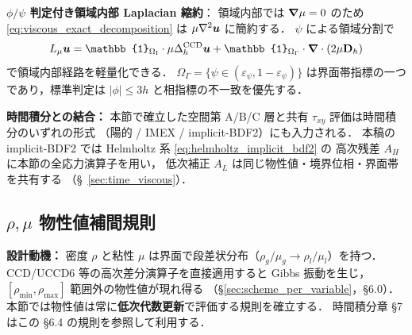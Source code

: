\noindent\textbf{$\phi/\psi$ 判定付き領域内部 Laplacian 縮約}：
領域内部では $\bm{\nabla}\mu=0$ のため \eqref{eq:viscous_exact_decomposition} は
$\mu\nabla^2\bm{u}$ に簡約する．
$\psi$ による領域分割で
\begin{equation*}
  L_\mu\bu
  = \mathbb{1}_{\Omega_{\mathrm{I}}}\cdot\mu\Delta_h^{\CCD}\bu
  + \mathbb{1}_{\Omega_\Gamma}\cdot\bnabla\cdot(2\mu\mathbf{D}_h)
\end{equation*}
で領域内部経路を軽量化できる．
$\Omega_\Gamma = \{\psi\in(\varepsilon_\psi, 1-\varepsilon_\psi)\}$
は界面帯指標の一つであり，標準判定は
$|\phi|\le 3h$ と相指標の不一致を優先する．

\medskip
\noindent\textbf{時間積分との結合：}
本節で確立した空間第 A/B/C 層と共有 $\tau_{xy}$ 評価は時間積分のいずれの形式
（陽的 / IMEX / implicit-BDF2）にも入力される．
本稿の implicit-BDF2 では Helmholtz 系 \eqref{eq:helmholtz_implicit_bdf2} の
高次残差 $A_H$ に本節の全応力演算子を用い，
低次補正 $A_L$ は同じ物性値・境界位相・界面帯を共有する
（\S~\ref{sec:time_viscous}）．

\subsection{\texorpdfstring{$\rho, \mu$ 物性値補間規則}{ρ, μ 物性値補間規則}}
\label{sec:rho_mu_interpolation}

\noindent\textbf{設計動機：}
密度 $\rho$ と粘性 $\mu$ は界面で段差状分布（$\rho_g/\mu_g \to \rho_l/\mu_l$）を持つ．
CCD/UCCD6 等の高次差分演算子を直接適用すると Gibbs 振動を生じ，
$[\rho_\text{min},\rho_\text{max}]$ 範囲外の物性値が現れ得る
（\S\ref{sec:scheme_per_variable}，§6.0）．
本節では物性値は常に\textbf{低次代数更新}で評価する規則を確立する．
時間積分章 §7 はこの §6.4 の規則を参照して利用する．

